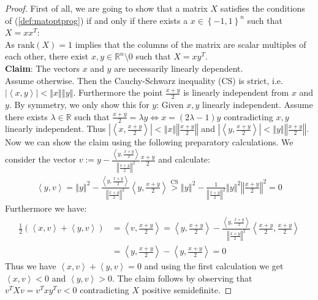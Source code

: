 \documentclass[12pt,a4paper]{article}
\theoremstyle{mythm}
\begin{document}
\begin{proof}
First of all, we are going to show that a matrix $ X $ satisfies the conditions of (\ref{def:matoptprog}) if and only if there exists a $ x \in \left\{ -1,1 \right\} ^{ n }  $
such that $ X = xx^T $: \\
As $ \text{rank} (X) = 1$ implies that the columns of the matrix are scalar multiples of each other, there exist $ x,y \in \mathbb{R} ^{ n } \setminus {0}  $ such that $ X =
xy^T $. \\
\textbf{Claim}: The vectors $x $ and $ y $ are necessarily linearly dependent. \\
Assume otherwise. Then the Cauchy-Schwarz inequality (CS) is strict, i.e. $ \left| \left\langle x , y \right\rangle \right| < \left\Vert x \right\Vert \left\Vert y
\right\Vert   $. Furthermore the point $ \frac{ x+y }{ 2 }  $ is linearly independent from $ x $ and $ y $. By symmetry, we only show this for $ y $: 
Given $ x,y $ linearly independent. Assume there exists $ \lambda \in \mathbb{R}  $ such that $ \frac{ x+y }{ 2 } = \lambda y \Leftrightarrow x = (2 \lambda -1) y$
contradicting $ x,y $ linearly independent. Thus $ \left| \left\langle x , \frac{ x+y }{ 2 }  \right\rangle  \right| < \left\Vert x \right\Vert \left\Vert \frac{ x+y }{ 2 }
\right\Vert  $   and
$ \left| \left\langle y ,  \frac{ x+y }{ 2 } \right\rangle  \right| < \left\Vert y \right\Vert \left\Vert \frac{ x+y }{ 2 } \right\Vert  $. 
Now we can show the claim using the following preparatory calculations.
We consider the vector $ v := y - \frac{ \left\langle y , \frac{ x+y }{ 2 } \right\rangle  }{ \left\Vert \frac{ x+y }{ 2 } \right\Vert ^{ 2 }  }  \frac{ x+y }{ 2 } $ and
calculate:
\begin{align*}
\left\langle y , v \right\rangle = \left\Vert y \right\Vert ^{ 2 } - \frac{ \left\langle y , \frac{ x+y }{ 2 } \right\rangle  }{ \left\Vert \frac{ x+y }{ 2 } \right\Vert ^{ 2
}  } \left\langle y , \frac{ x+y }{ 2 } \right\rangle \overset{ \text{CS}  }{ >} \left\Vert y \right\Vert ^{ 2 } - \frac{ 1 }{ \left\Vert \frac{ x+y }{ 2 } \right\Vert ^{ 2 }
} \left\Vert y \right\Vert ^{ 2 } \left\Vert \frac{ x+y }{ 2 } \right\Vert ^{ 2 } =0 
\end{align*} 
Furthermore we have:
\begin{align*}
\frac{ 1 }{ 2 } \left(  \left\langle x , v \right\rangle + \left\langle y , v  \right\rangle \right) &= 
\left\langle v  , \frac{ x+y }{ 2 }  \right\rangle = \left\langle y , \frac{ x+y }{ 2 }
\right\rangle - \frac{ \left\langle y , \frac{ x+y }{ 2 }  \right\rangle  }{ \left\Vert \frac{ x+y }{ 2 }  \right\Vert ^{ 2 }  } \left\langle \frac{ x+y }{ 2 } , \frac{ x+y }{
2 } \right\rangle \\
&= \left\langle y , \frac{ x+y }{ 2 } \right\rangle - \left\langle y , \frac{ x+y }{ 2 }  \right\rangle =0
\end{align*} 
Thus we have $ \left\langle x , v \right\rangle + \left\langle y , v  \right\rangle =0 $ and using the first calculation we get $ \left\langle x , v \right\rangle <0 $ and $
\left\langle y , v  \right\rangle   > 0$. 
The claim follows by observing that $ v ^T X v = v ^T x y ^T v < 0  $ contradicting $ X $ positive semidefinite.


\end{proof}
\end{document}
